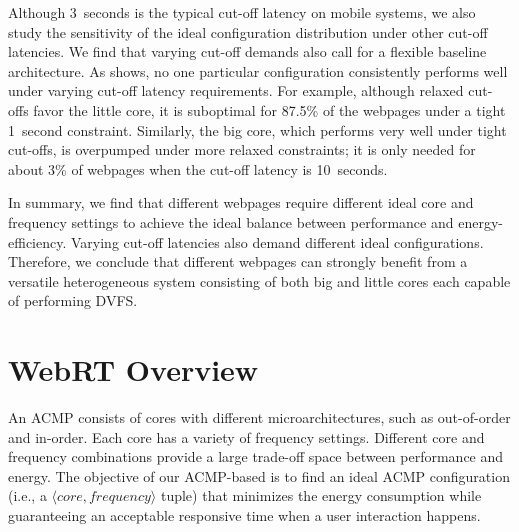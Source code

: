 Although 3~seconds is the typical cut-off latency on mobile systems, we also study the sensitivity of the ideal configuration distribution under other cut-off latencies. We find that varying cut-off demands also call for a flexible baseline architecture. As  shows, no one particular configuration consistently performs well under varying cut-off latency requirements. For example, although relaxed cut-offs favor the little core, it is suboptimal for 87.5\% of the webpages under a tight 1~second constraint. Similarly, the big core, which performs very well under tight cut-offs, is overpumped under more relaxed constraints; it is only needed for about 3\% of webpages when the cut-off latency is 10~seconds.

In summary, we find that different webpages require different ideal core and frequency settings to achieve the ideal balance between performance and energy-efficiency. Varying cut-off latencies also demand different ideal configurations. Therefore, we conclude that different webpages can strongly benefit from a versatile heterogeneous system consisting of both big and little cores each capable of performing DVFS.

\section{WebRT Overview}
\label{sec:runtime:overview}

An ACMP consists of cores with different microarchitectures, such as out-of-order and in-order. Each core has a variety of frequency settings. Different core and frequency combinations provide a large trade-off space between performance and energy. The objective of our ACMP-based \webrt is to find an ideal ACMP configuration (i.e., a $\langle core, frequency \rangle$ tuple) that minimizes the energy consumption while guaranteeing an acceptable responsive time when a user interaction happens.


